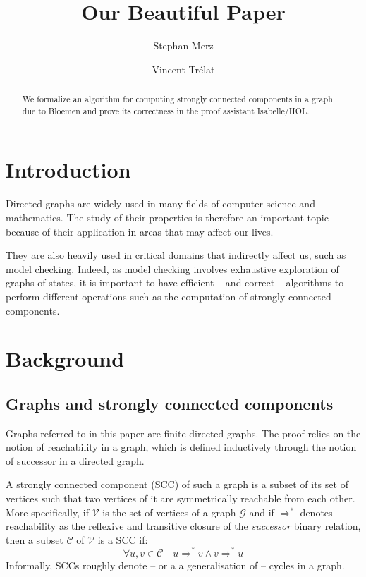 \documentclass[sigplan,10pt,anonymous,review]{acmart}
\title{Our Beautiful Paper}
\author{Stephan Merz}
\affiliation{
  \institution{University of Lorraine, CNRS, Inria, LORIA}
  \city{Nancy}
  \country{France}
}
\author{Vincent Trélat}
\affiliation{
  \institution{University of Lorraine}
  \city{Nancy}
  \country{France}
}
\begin{document}
\begin{abstract}
  We formalize an algorithm for computing strongly connected components in a graph due to Bloemen and prove its correctness in the proof assistant Isabelle/HOL.
\end{abstract}

\maketitle

\section{Introduction}
\label{sec:introduction}
Directed graphs are widely used in many fields of computer science and mathematics.
The study of their properties is therefore an important topic because of their application in areas that may affect our lives.

They are also heavily used in critical domains that indirectly affect us, such as model checking.
Indeed, as model checking involves exhaustive exploration of graphs of states, it is important to have efficient -- and correct -- algorithms to perform different operations such as the computation of strongly connected components.

\section{Background}
\label{sec:background}

\subsection{Graphs and strongly connected components}
\label{sec:graphs}
Graphs referred to in this paper are finite directed graphs.
The proof relies on the notion of reachability in a graph, which is defined inductively through the notion of successor in a directed graph.

A strongly connected component (SCC) of such a graph is a subset of its set of vertices such that two vertices of it are symmetrically reachable from each other.
More specifically, if $\mathcal{V}$ is the set of vertices of a graph $\mathcal{G}$ and if $\Rightarrow^*$ denotes reachability as the reflexive and transitive closure of the \emph{successor} binary relation, then a subset $\mathcal{C}$ of $\mathcal{V}$ is a SCC if:
\begin{equation*}
  \forall u, v \in \mathcal{C} \quad u \Rightarrow^* v \wedge v \Rightarrow^* u
\end{equation*}
Informally, SCCs roughly denote -- or a a generalisation of -- cycles in a graph.
\end{document}
